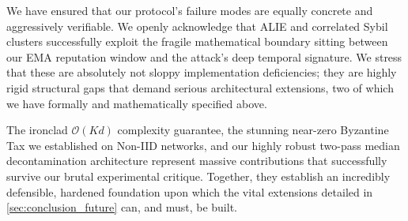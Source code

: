 \documentclass[../main.tex]{subfiles}
\begin{document}
We have ensured that our protocol's failure modes are equally concrete and aggressively verifiable. We openly acknowledge that ALIE and correlated Sybil clusters successfully exploit the fragile mathematical boundary sitting between our EMA reputation window and the attack's deep temporal signature. We stress that these are absolutely not sloppy implementation deficiencies; they are highly rigid structural gaps that demand serious architectural extensions, two of which we have formally and mathematically specified above.

The ironclad $\mathcal{O}(Kd)$ complexity guarantee, the stunning near-zero Byzantine Tax we established on Non-IID networks, and our highly robust two-pass median decontamination architecture represent massive contributions that successfully survive our brutal experimental critique. Together, they establish an incredibly defensible, hardened foundation upon which the vital extensions detailed in \cref{sec:conclusion_future} can, and must, be built.
\end{document}
